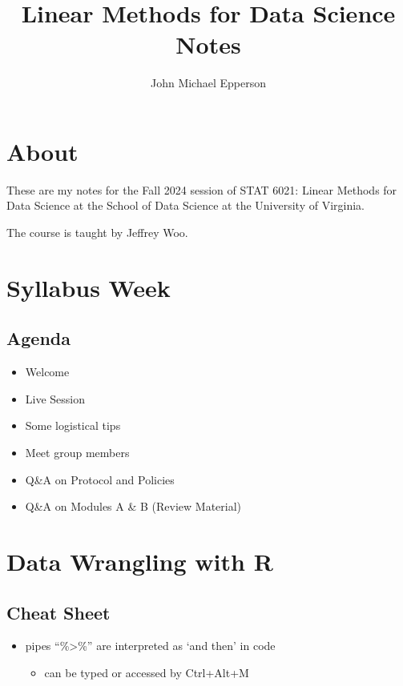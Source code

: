 \documentclass[
  openany]{book}
\title{Linear Methods for Data Science Notes}
\author{John Michael Epperson}
\date{}
\providecommand{\tightlist}{%
  \setlength{\itemsep}{0pt}\setlength{\parskip}{0pt}}
\begin{document}
\maketitle

{
\setcounter{tocdepth}{1}
\tableofcontents
}
\chapter*{About}\label{about}

These are my notes for the Fall 2024 session of STAT 6021: Linear Methods for Data Science at the School of Data Science at the University of Virginia.

The course is taught by Jeffrey Woo.

\chapter*{Syllabus Week}\label{syllabus-week}

\section{Agenda}\label{agenda}

\begin{itemize}
\tightlist
\item
  Welcome
\item
  Live Session
\item
  Some logistical tips
\item
  Meet group members
\item
  Q\&A on Protocol and Policies
\item
  Q\&A on Modules A \& B (Review Material)
\end{itemize}

\chapter{Data Wrangling with R}\label{data-wrangling-with-r}

\section*{Cheat Sheet}\label{cheat-sheet}

\begin{itemize}
\tightlist
\item
  pipes ``\%\textgreater\%'' are interpreted as `and then' in code

  \begin{itemize}
  \tightlist
  \item
    can be typed or accessed by Ctrl+Alt+M
  \end{itemize}
\end{itemize}
\end{document}

